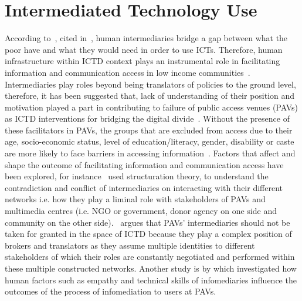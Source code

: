 \section{Intermediated Technology Use}
According to~\cite{heeks1999tyranny}, cited in~\cite{bailur2012complex}, human intermediaries bridge a gap between what the poor have and what they would need in order to use ICTs. Therefore, human infrastructure within ICTD context plays an instrumental role in facilitating information and communication access in low income communities~\citep{sambasivan2010human}. Intermediaries play roles beyond being translators of policies to the ground level, therefore, it has been suggested that, lack of understanding of their position and motivation played a part in contributing to failure of public access venues (PAVs) as ICTD interventions for bridging the digital divide~\citep{bailur2010liminal}. Without the presence of these facilitators in PAVs, the groups that are excluded from access due to their age, socio-economic status, level of education/literacy, gender, disability or caste are more likely to face barriers in accessing information~\citep{ramirez2013infomediaries}. Factors that affect and shape the outcome of facilitating information and communication access have been explored, for instance~\cite{bailur2010liminal} used structuration theory\citep{jones2008giddens}, to understand the contradiction and conflict of intermediaries on interacting with their different networks i.e. how they play a liminal role with stakeholders of PAVs and multimedia centres (i.e. NGO or government, donor agency on one side and community on the other side).~\cite{bailur2012complex} argues that PAVs' intermediaries should not be taken for granted in the space of ICTD because they play a complex position of brokers and translators as they assume multiple identities to different stakeholders of which their roles are constantly negotiated and performed within these multiple constructed networks. Another study is by \cite{ramirez2013infomediaries} which investigated how human factors such as empathy and technical skills of infomediaries influence the outcomes of the process of infomediation to users at PAVs. 


